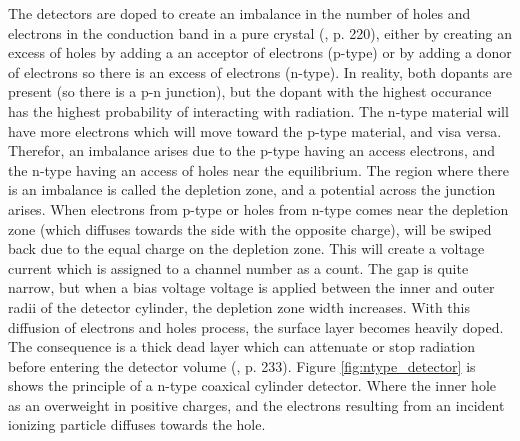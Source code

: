 \noindent 
The detectors are doped to create an imbalance in the number of holes and electrons in the conduction band in a pure crystal (\cite{Leo1994}, p. 220), either by creating an excess of holes by adding a an acceptor of electrons (p-type) or by adding a donor of electrons so there is an excess of electrons (n-type). In reality, both dopants are present (so there is a p-n junction), but the dopant with the highest occurance has the highest probability of interacting with radiation. The n-type material will have more electrons which will move toward the p-type material, and visa versa. Therefor, an imbalance arises due to the p-type having an access electrons, and the n-type having an access of holes near the equilibrium. The region where there is an imbalance is called the depletion zone, and a potential across the junction arises. When electrons from p-type or holes from n-type comes near the depletion zone (which diffuses towards the side with the opposite charge), will be swiped back due to the equal charge on the depletion zone. This will create a voltage current which is assigned to a channel number as a count. The gap is quite narrow, but when a bias voltage voltage is applied between the inner and outer radii of the detector cylinder, the depletion zone width increases. With this diffusion of electrons and holes process, the surface layer becomes heavily doped. The consequence is a thick dead layer which can attenuate or stop radiation before entering the detector volume (\cite{Leo1994}, p. 233).  Figure \ref{fig:ntype_detector} is shows the principle of a n-type coaxical cylinder detector. Where the inner hole as an overweight in positive charges, and the electrons resulting from an incident ionizing particle diffuses towards the hole. \\


